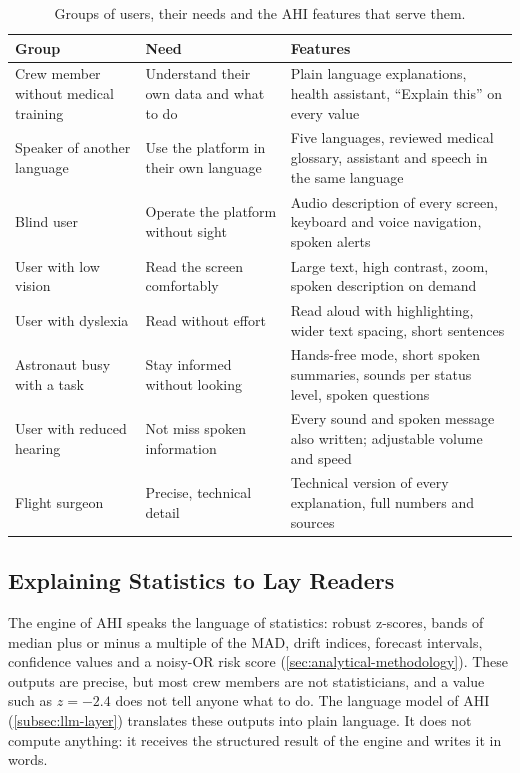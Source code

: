 \begin{table}[htbp]
\centering
\vspace{0.8em}
\caption{Groups of users, their needs and the AHI features that serve them.}
\label{tab:inclusion-users}
\footnotesize
\begin{tabular}{p{3.4cm}p{5.0cm}p{5.6cm}}
\hline
\textbf{Group} & \textbf{Need} & \textbf{Features} \\
\hline
Crew member without medical training & Understand their own data and what to do & Plain language explanations, health assistant, ``Explain this'' on every value \\
Speaker of another language & Use the platform in their own language & Five languages, reviewed medical glossary, assistant and speech in the same language \\
Blind user & Operate the platform without sight & Audio description of every screen, keyboard and voice navigation, spoken alerts \\
User with low vision & Read the screen comfortably & Large text, high contrast, zoom, spoken description on demand \\
User with dyslexia & Read without effort & Read aloud with highlighting, wider text spacing, short sentences \\
Astronaut busy with a task & Stay informed without looking & Hands-free mode, short spoken summaries, sounds per status level, spoken questions \\
User with reduced hearing & Not miss spoken information & Every sound and spoken message also written; adjustable volume and speed \\
Flight surgeon & Precise, technical detail & Technical version of every explanation, full numbers and sources \\
\hline
\end{tabular}
\vspace{1.2em}
\end{table}

\subsection{Explaining Statistics to Lay Readers}
\label{subsec:lay-explanations}

The engine of AHI speaks the language of statistics: robust z-scores, bands of median plus or minus a multiple of the MAD, drift indices, forecast intervals, confidence values and a noisy-OR risk score (\ref{sec:analytical-methodology}). These outputs are precise, but most crew members are not statisticians, and a value such as $z=-2.4$ does not tell anyone what to do. The language model of AHI (\ref{subsec:llm-layer}) translates these outputs into plain language. It does not compute anything: it receives the structured result of the engine and writes it in words.

